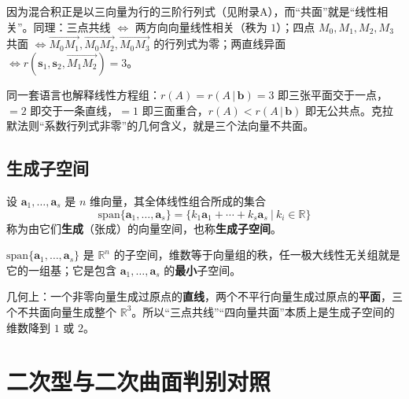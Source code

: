 因为混合积正是以三向量为行的三阶行列式（见附录A），而“共面”就是“线性相关”。同理：三点共线 $\iff$ 两方向向量线性相关（秩为 $1$）；四点 $M_0,M_1,M_2,M_3$ 共面 $\iff\overrightarrow{M_0M_1},\overrightarrow{M_0M_2},\overrightarrow{M_0M_3}$ 的行列式为零；两直线异面 $\iff r(\boldsymbol{s}_1,\boldsymbol{s}_2,\overrightarrow{M_1M_2})=3$。

同一套语言也解释线性方程组：$r(A)=r(A\,|\,\boldsymbol{b})=3$ 即三张平面交于一点，$=2$ 即交于一条直线，$=1$ 即三面重合，$r(A)<r(A\,|\,\boldsymbol{b})$ 即无公共点。克拉默法则“系数行列式非零”的几何含义，就是三个法向量不共面。

\subsection{生成子空间}

\begin{definition}
设 $\boldsymbol{a}_1,\dots,\boldsymbol{a}_s$ 是 $n$ 维向量，其全体线性组合所成的集合
\[
\mathrm{span}\{\boldsymbol{a}_1,\dots,\boldsymbol{a}_s\}
=\bigl\{k_1\boldsymbol{a}_1+\cdots+k_s\boldsymbol{a}_s\ \big|\ k_i\in\mathbb{R}\bigr\}
\]
称为由它们\textbf{生成}（张成）的向量空间，也称\textbf{生成子空间}。
\end{definition}

\begin{theorem}
$\mathrm{span}\{\boldsymbol{a}_1,\dots,\boldsymbol{a}_s\}$ 是 $\mathbb{R}^{n}$ 的子空间，维数等于向量组的秩，任一极大线性无关组就是它的一组基；它是包含 $\boldsymbol{a}_1,\dots,\boldsymbol{a}_s$ 的\textbf{最小}子空间。
\end{theorem}

几何上：一个非零向量生成过原点的\textbf{直线}，两个不平行向量生成过原点的\textbf{平面}，三个不共面向量生成整个 $\mathbb{R}^{3}$。所以“三点共线”“四向量共面”本质上是生成子空间的维数降到 $1$ 或 $2$。


\section{二次型与二次曲面判别对照}

